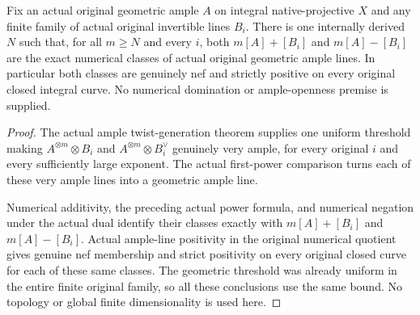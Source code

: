 \begin{theorem}
\label{thm:native-numerical-ample-domination}
\leanok
{}
Fix an actual original geometric ample $A$ on integral
native-projective $X$ and any finite family of actual
original invertible lines $B_i$. There is one internally
derived $N$ such that, for all $m\ge N$ and every $i$, both
$m[A]+[B_i]$ and $m[A]-[B_i]$ are the exact numerical classes
of actual original geometric ample lines. In particular
both classes are genuinely nef and strictly positive on
every original closed integral curve. No numerical
domination or ample-openness premise is supplied.
\end{theorem}
\begin{proof}
The actual ample twist-generation theorem supplies one
uniform threshold making $A^{\otimes m}\otimes B_i$ and
$A^{\otimes m}\otimes B_i^\vee$ genuinely very ample, for
every original $i$ and every sufficiently large exponent.
The actual first-power comparison turns each of these
very ample lines into a geometric ample line.

Numerical additivity, the preceding actual power formula,
and numerical negation under the actual dual identify
their classes exactly with $m[A]+[B_i]$ and
$m[A]-[B_i]$. Actual ample-line positivity in the original
numerical quotient gives genuine nef membership and
strict positivity on every original closed curve for each
of these same classes. The geometric threshold was already
uniform in the entire finite original family, so all these
conclusions use the same bound. No topology or global
finite dimensionality is used here.
\end{proof}
